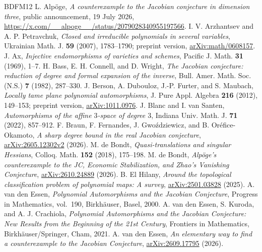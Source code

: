 \documentclass[11pt,reqno]{amsart}
\numberwithin{equation}{section}
\theoremstyle{plain}
\theoremstyle{definition}
\theoremstyle{remark}
\begin{document}
\begin{thebibliography}{BDFM12}
 L. Alp\"oge,
\emph{A counterexample to the Jacobian conjecture in dimension three},
public announcement, 19 July 2026,
\url{https://x.com/__alpoge__/status/2079028340955197566}.
 I. V. Arzhantsev and A. P. Petravchuk,
\emph{Closed and irreducible polynomials in several variables},
Ukrainian Math. J. \textbf{59} (2007), 1783--1790;
preprint version, \href{https://arxiv.org/abs/math/0608157}{arXiv:math/0608157}.
 J. Ax,
\emph{Injective endomorphisms of varieties and schemes},
Pacific J. Math. \textbf{31} (1969), 1--7.
 H. Bass, E. H. Connell, and D. Wright,
\emph{The Jacobian conjecture: reduction of degree and formal expansion of the inverse},
Bull. Amer. Math. Soc. (N.S.) \textbf{7} (1982), 287--330.
 J. Berson, A. Dubouloz, J.-P. Furter, and S. Maubach,
\emph{Locally tame plane polynomial automorphisms},
J. Pure Appl. Algebra \textbf{216} (2012), 149--153;
preprint version, \href{https://arxiv.org/abs/1011.0976}{arXiv:1011.0976}.
 J. Blanc and I. van Santen,
\emph{Automorphisms of the affine $3$-space of degree $3$},
Indiana Univ. Math. J. \textbf{71} (2022), 857--912.
 F. Braun, F. Fernandes, J. Gwo\'zdziewicz, and B. Or\'efice-Okamoto,
\emph{A sharp degree bound in the real Jacobian conjecture},
\href{https://arxiv.org/abs/2605.12302v2}{arXiv:2605.12302v2} (2026).
 M. de Bondt,
\emph{Quasi-translations and singular Hessians},
Colloq. Math. \textbf{152} (2018), 175--198.
 M. de Bondt,
\emph{Alp\"oge's counterexample to the JC, Economic Stabilization, and Zhao's Vanishing Conjecture},
\href{https://arxiv.org/abs/2610.24889}{arXiv:2610.24889} (2026).
 B. El Hilany,
\emph{Around the topological classification problem of polynomial maps: A survey},
\href{https://arxiv.org/abs/2501.03828}{arXiv:2501.03828} (2025).
 A. van den Essen,
\emph{Polynomial Automorphisms and the Jacobian Conjecture},
Progress in Mathematics, vol.~190, Birkh\"auser, Basel, 2000.
 A. van den Essen, S. Kuroda, and A. J. Crachiola,
\emph{Polynomial Automorphisms and the Jacobian Conjecture:
New Results from the Beginning of the 21st Century},
Frontiers in Mathematics, Birkh\"auser/Springer, Cham, 2021.
 A. van den Essen,
\emph{An elementary way to find a counterexample to the Jacobian Conjecture},
\href{https://arxiv.org/abs/2609.17795}{arXiv:2609.17795} (2026).

\end{thebibliography}
\end{document}
